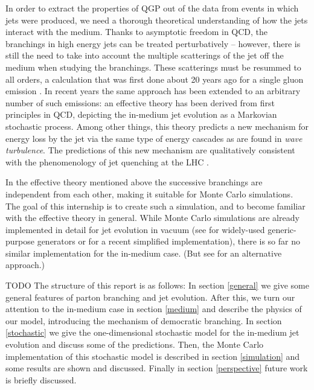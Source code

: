 \documentclass[a4paper,12pt]{article}
\numberwithin{equation}{section}
\begin{document}
In order to extract the properties of QGP out of the data from events in which jets were produced, we need a thorough theoretical understanding of how the jets interact with the medium. Thanks to asymptotic freedom in QCD, the branchings in high energy jets can be treated perturbatively -- however, there is still the need to take into account the multiple scatterings of the jet off the medium when studying the branchings. These scatterings must be resummed to all orders, a calculation that was first done about 20 years ago for a single gluon emission \cite{Baier:1996kr,Zakharov:1997uu}. In recent years the same approach has been extended to an arbitrary number of such emissions\cite{Blaizot:2012fh,Blaizot:2013hx}: an effective theory has been derived from first principles in QCD, depicting the in-medium jet evolution as a Markovian stochastic process. Among other things, this theory predicts a new mechanism for energy loss by the jet via the same type of energy cascades as are found in {\em wave turbulence}. The predictions of this new mechanism are qualitatively consistent with the phenomenology of jet
quenching at the LHC \cite{Aad:2010bu,Chatrchyan:2011sx}.

In the effective theory mentioned above the successive branchings are independent from each other, making it suitable for Monte Carlo simulations. The goal of this internship is to create such a simulation, and to become familiar with the effective theory in general. While Monte Carlo simulations are already implemented in detail for jet evolution in vacuum (see \cite{Pythia,Herwig} for widely-used generic-purpose generators or \cite{SmallR} for a recent simplified implementation), there is so far no similar implementation for the in-medium case. (But see \cite{Zapp:2012ak} for an alternative approach.) 



TODO
The structure of this report is as follows: 
In section \ref{general} we give some general features of parton branching and jet evolution. After this, we turn our attention to the in-medium case in section \ref{medium} and describe the physics of our model, introducing the mechanism of democratic branching. In section \ref{stochastic} we give the one-dimensional stochastic model for the in-medium jet evolution and discuss some of the predictions. Then, the Monte Carlo implementation of this stochastic model is described in section \ref{simulation} and some results are shown and discussed. Finally in section \ref{perspective} future work is briefly discussed.
\end{document}
